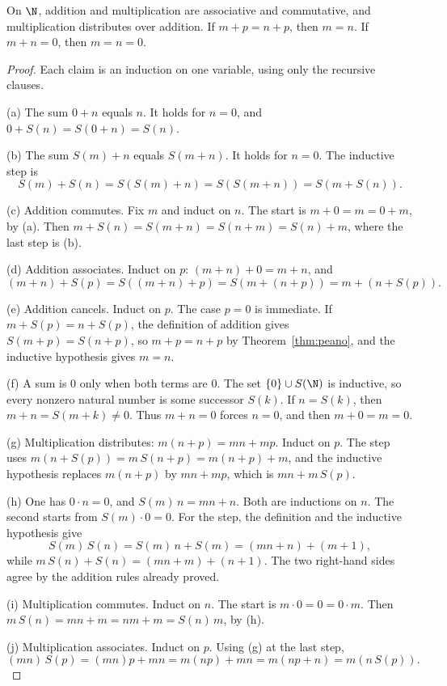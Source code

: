 \begin{proposition}\label{prop:semiring}
On $\N$, addition and multiplication are associative and commutative, and multiplication distributes over addition. If $m+p=n+p$, then $m=n$. If $m+n=0$, then $m=n=0$.
\end{proposition}
\begin{proof}
Each claim is an induction on one variable, using only the recursive clauses.

(a) The sum $0+n$ equals $n$. It holds for $n=0$, and $0+S(n)=S(0+n)=S(n)$.

(b) The sum $S(m)+n$ equals $S(m+n)$. It holds for $n=0$. The inductive step is
\[
S(m)+S(n)=S(S(m)+n)=S(S(m+n))=S(m+S(n)).
\]

(c) Addition commutes. Fix $m$ and induct on $n$. The start is $m+0=m=0+m$, by (a). Then $m+S(n)=S(m+n)=S(n+m)=S(n)+m$, where the last step is (b).

(d) Addition associates. Induct on $p$: $(m+n)+0=m+n$, and
\[
(m+n)+S(p)=S((m+n)+p)=S(m+(n+p))=m+(n+S(p)).
\]

(e) Addition cancels. Induct on $p$. The case $p=0$ is immediate. If $m+S(p)=n+S(p)$, the definition of addition gives $S(m+p)=S(n+p)$, so $m+p=n+p$ by Theorem~\ref{thm:peano}, and the inductive hypothesis gives $m=n$.

(f) A sum is $0$ only when both terms are $0$. The set $\{0\}\cup S(\N)$ is inductive, so every nonzero natural number is some successor $S(k)$. If $n=S(k)$, then $m+n=S(m+k)\ne 0$. Thus $m+n=0$ forces $n=0$, and then $m+0=m=0$.

(g) Multiplication distributes: $m(n+p)=mn+mp$. Induct on $p$. The step uses $m(n+S(p))=m\,S(n+p)=m(n+p)+m$, and the inductive hypothesis replaces $m(n+p)$ by $mn+mp$, which is $mn+m\,S(p)$.

(h) One has $0\cdot n=0$, and $S(m)\,n=mn+n$. Both are inductions on $n$. The second starts from $S(m)\cdot 0=0$. For the step, the definition and the inductive hypothesis give
\[
S(m)\,S(n)=S(m)\,n+S(m)=(mn+n)+(m+1),
\]
while $m\,S(n)+S(n)=(mn+m)+(n+1)$. The two right-hand sides agree by the addition rules already proved.

(i) Multiplication commutes. Induct on $n$. The start is $m\cdot 0=0=0\cdot m$. Then $m\,S(n)=mn+m=nm+m=S(n)\,m$, by (h).

(j) Multiplication associates. Induct on $p$. Using (g) at the last step,
\[
(mn)\,S(p)=(mn)p+mn=m(np)+mn=m(np+n)=m(n\,S(p)).
\]
\end{proof}

